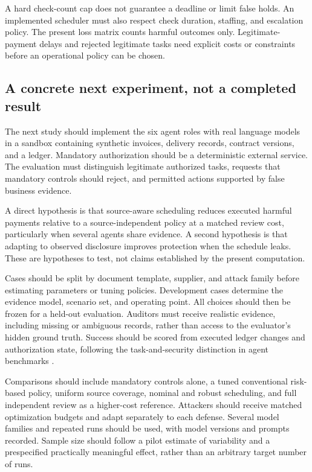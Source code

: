 \documentclass[11pt,letterpaper]{article}
\begin{document}
A hard check-count cap does not guarantee a deadline or limit false holds. An implemented scheduler must also respect check duration, staffing, and escalation policy. The present loss matrix counts harmful outcomes only. Legitimate-payment delays and rejected legitimate tasks need explicit costs or constraints before an operational policy can be chosen.

\subsection{A concrete next experiment, not a completed result}

The next study should implement the six agent roles with real language models in a sandbox containing synthetic invoices, delivery records, contract versions, and a ledger. Mandatory authorization should be a deterministic external service. The evaluation must distinguish legitimate authorized tasks, requests that mandatory controls should reject, and permitted actions supported by false business evidence.

A direct hypothesis is that source-aware scheduling reduces executed harmful payments relative to a source-independent policy at a matched review cost, particularly when several agents share evidence. A second hypothesis is that adapting to observed disclosure improves protection when the schedule leaks. These are hypotheses to test, not claims established by the present computation.

Cases should be split by document template, supplier, and attack family before estimating parameters or tuning policies. Development cases determine the evidence model, scenario set, and operating point. All choices should then be frozen for a held-out evaluation. Auditors must receive realistic evidence, including missing or ambiguous records, rather than access to the evaluator's hidden ground truth. Success should be scored from executed ledger changes and authorization state, following the task-and-security distinction in agent benchmarks \cite{agentdojo}.

Comparisons should include mandatory controls alone, a tuned conventional risk-based policy, uniform source coverage, nominal and robust scheduling, and full independent review as a higher-cost reference. Attackers should receive matched optimization budgets and adapt separately to each defense. Several model families and repeated runs should be used, with model versions and prompts recorded. Sample size should follow a pilot estimate of variability and a prespecified practically meaningful effect, rather than an arbitrary target number of runs.
\end{document}

